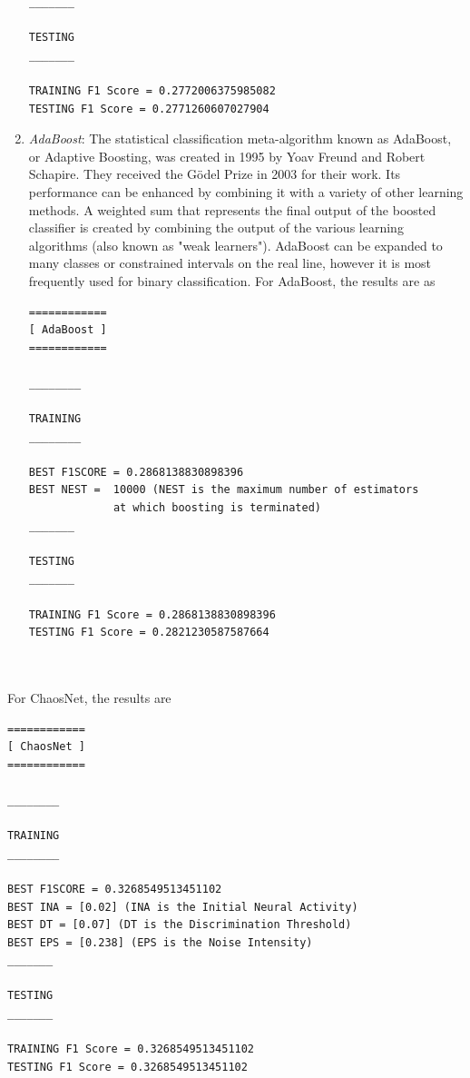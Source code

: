 \documentclass[runningheads]{llncs}
\begin{document}
\begin{enumerate}
\begin{verbatim}
_______

TESTING
_______

TRAINING F1 Score = 0.2772006375985082
TESTING F1 Score = 0.2771260607027904

\end{verbatim}
\item \textit{AdaBoost}: The statistical classification meta-algorithm known as AdaBoost, or Adaptive Boosting, was created in 1995 by Yoav Freund and Robert Schapire. They received the Gödel Prize in 2003 for their work. Its performance can be enhanced by combining it with a variety of other learning methods. A weighted sum that represents the final output of the boosted classifier is created by combining the output of the various learning algorithms (also known as "weak learners"). AdaBoost can be expanded to many classes or constrained intervals on the real line, however it is most frequently used for binary classification. For AdaBoost, the results are as
\begin{verbatim}
============
[ AdaBoost ]
============

________

TRAINING
________

BEST F1SCORE = 0.2868138830898396
BEST NEST =  10000 (NEST is the maximum number of estimators 
             at which boosting is terminated)
_______

TESTING
_______

TRAINING F1 Score = 0.2868138830898396
TESTING F1 Score = 0.2821230587587664

\end{verbatim}
\end{enumerate}
\textbf{\\\\}
For ChaosNet, the results are

\begin{verbatim}
============
[ ChaosNet ]
============

________

TRAINING
________

BEST F1SCORE = 0.3268549513451102
BEST INA = [0.02] (INA is the Initial Neural Activity)
BEST DT = [0.07] (DT is the Discrimination Threshold)
BEST EPS = [0.238] (EPS is the Noise Intensity)
_______

TESTING
_______

TRAINING F1 Score = 0.3268549513451102
TESTING F1 Score = 0.3268549513451102

\end{verbatim}
\end{document}
